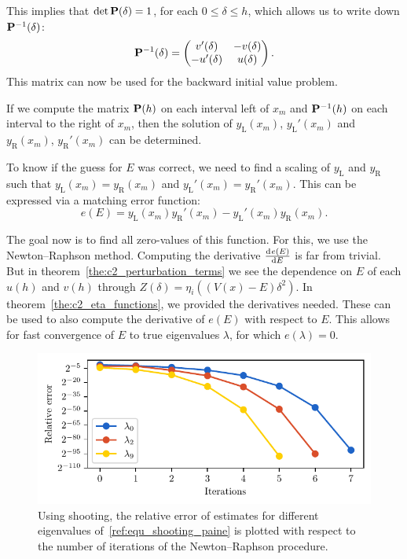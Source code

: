 This implies that $\det\vb{P}(\delta) = 1$, for each $0\leq \delta\leq h$, which allows us to write down $\vb{P}^{-1}(\delta)$:
$$
    \vb{P}^{-1}(\delta) = \begin{pmatrix} v'(\delta) & -v(\delta) \\ -u'(\delta) & u(\delta) \end{pmatrix}\text{.}
$$
This matrix can now be used for the backward initial value problem.

If we compute the matrix $\vb{P}(h)$ on each interval left of $x_m$ and $\vb{P}^{-1}(h)$ on each interval to the right of $x_m$, then the solution of $y_\text{L}(x_m)$, $y_\text{L}'(x_m)$ and $y_\text{R}(x_m)$, $y_\text{R}'(x_m)$ can be determined.

To know if the guess for $E$ was correct, we need to find a scaling of $y_\text{L}$ and $y_\text{R}$ such that $y_\text{L}(x_m) = y_\text{R}(x_m)$ and $y_\text{L}'(x_m) = y_\text{R}'(x_m)$. This can be expressed via a matching error function:
\begin{equation}\label{equ:c2_matching_error}
    e(E) = y_\text{L}(x_m) y_\text{R}'(x_m) - y_\text{L}'(x_m) y_\text{R}(x_m)\text{.}
\end{equation}

The goal now is to find all zero-values of this function. For this, we use the Newton--Raphson method. Computing the derivative $\dv[]{e(E)}{E}$ is far from trivial. But in theorem~\ref{the:c2_perturbation_terms} we see the dependence on $E$ of each $u(h)$ and $v(h)$ through $Z(\delta) = \eta_i\left((V(x) - E)\delta^2\right)$. In theorem~\ref{the:c2_eta_functions}, we provided the derivatives needed. These can be used to also compute the derivative of $e(E)$ with respect to $E$. This allows for fast convergence of $E$ to true eigenvalues $\lambda$, for which $e(\lambda) = 0$.

\begin{figure}
    \begin{center}
        \includegraphics[width=\textwidth]{img/chapter2/prufer/shooting_convergence_float128.pdf}
    \end{center}
    \caption{Using shooting, the relative error of estimates for different eigenvalues of~\eqref{ref:equ_shooting_paine} is plotted with respect to the number of iterations of the Newton--Raphson procedure.}\label{fig:c2_shooting_convergence}
\end{figure}

